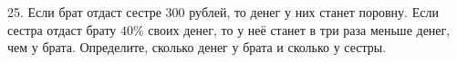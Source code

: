 25. Если брат отдаст сестре 300 рублей, то денег у них станет поровну. Если сестра отдаст брату $40\%$ своих денег, то у неё станет в три раза меньше денег, чем у брата.
Определите, сколько денег у брата и сколько у сестры.\\
